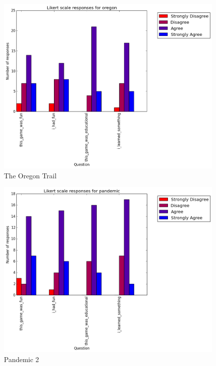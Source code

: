 			\begin{figure}[h] 
			\centering 
			\includegraphics[width=\textwidth]{oregon_likert.png} 
			\caption{The Oregon Trail}
			\end{figure}

			\begin{figure}[h] 
			\centering 
			\includegraphics[width=\textwidth]{pandemic_likert.png} 
			\caption{Pandemic 2}
			\end{figure}

\cleardoublepage

